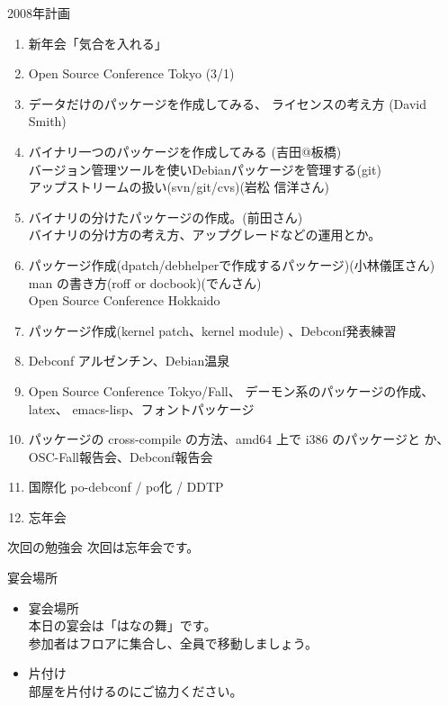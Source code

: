 \documentclass[cjk,dvipdfmx,12pt]{beamer}
\begin{document}
\begin{frame}{2008年計画}

{\scriptsize
\begin{enumerate}
 \item 新年会「気合を入れる」
 \item Open Source Conference Tokyo (3/1)
 \item データだけのパッケージを作成してみる、
       ライセンスの考え方 (David Smith)
 \item バイナリ一つのパッケージを作成してみる (吉田@板橋)\\
       バージョン管理ツールを使いDebianパッケージを管理する(git)\\
       アップストリームの扱い(svn/git/cvs)(岩松 信洋さん)
 \item バイナリの分けたパッケージの作成。(前田さん)\\
       バイナリの分け方の考え方、アップグレードなどの運用とか。
 \item パッケージ作成(dpatch/debhelperで作成するパッケージ)(小林儀匡さん)\\
       man の書き方(roff or docbook)(でんさん)\\
       Open Source Conference Hokkaido
 \item パッケージ作成(kernel patch、kernel module)
       、Debconf発表練習
 \item Debconf アルゼンチン、Debian温泉

 \item Open Source Conference Tokyo/Fall、
       デーモン系のパッケージの作成、latex、 emacs-lisp、フォントパッケージ
 \item パッケージの cross-compile の方法、amd64 上で i386 のパッケージと
       か、OSC-Fall報告会、Debconf報告会
 \item 国際化 po-debconf / po化 / DDTP
 \item 忘年会
\end{enumerate}
}
\end{frame}


\begin{frame}{次回の勉強会}
次回は忘年会です。
\end{frame}

\begin{frame}{宴会場所}
\begin{itemize}
 \item 宴会場所\\
       本日の宴会は「はなの舞」です。\\
       参加者はフロアに集合し、全員で移動しましょう。
 \item 片付け\\
       部屋を片付けるのにご協力ください。
\end{itemize}
\end{frame}
\end{document}
